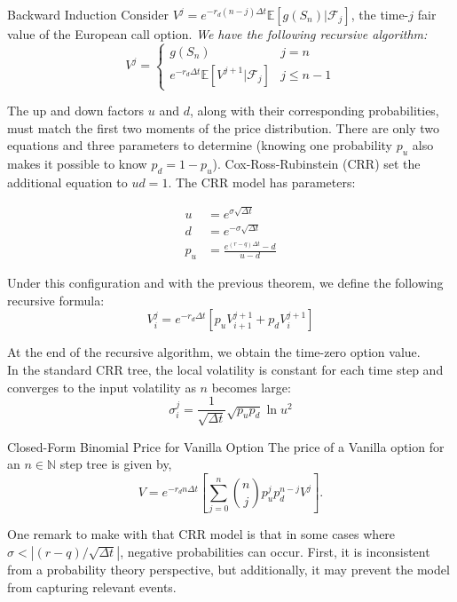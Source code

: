 \begin{thm}{Backward Induction}{}
	Consider \(V^j = e^{-r_d (n-j) \Delta t} \mathbb{E}[g(S_n) | \mathcal{F}_j]\), the time-\(j\) fair value of the European call option. \emph{We have the following recursive algorithm:}
	\[
		V^j =
		\begin{cases}
			g(S_n)                                                & j = n      \\
			e^{-r_d \Delta t} \mathbb{E}[V^{j+1} | \mathcal{F}_j] & j \leq n-1
		\end{cases}
	\]
\end{thm}

The up and down factors \(u\) and \(d\), along with their corresponding probabilities, must match the first two moments of the price distribution. There are only two equations and three parameters to determine (knowing one probability \(p_u\) also makes it possible to know \(p_d = 1-p_u\)). Cox-Ross-Rubinstein (CRR) set the additional equation to \(ud = 1\). The CRR model has parameters:

\begin{align}
	u   & = e^{\sigma \sqrt{\Delta t}}          \\
	d   & = e^{-\sigma \sqrt{\Delta t}}         \\
	p_u & = \frac{e^{(r-q)\Delta t} - d}{u - d}
\end{align}

Under this configuration and with the previous theorem, we define the following recursive formula:
\begin{equation}
	V^j_i = e^{-r_d \Delta t} \left[ p_u V^{j+1}_{i+1} + p_d V^{j+1}_i \right]
\end{equation}

At the end of the recursive algorithm, we obtain the time-zero option value.\\
In the standard CRR tree, the local volatility is constant for each time step and converges to the input volatility as \(n\) becomes large:
\begin{equation}
	\sigma^{j}_i = \frac{1}{\sqrt{\Delta t}} \sqrt{p_u p_d} \ln u^2
\end{equation}

\begin{thm}{Closed-Form Binomial Price for Vanilla Option}{}
	The price of a Vanilla option for an \(n \in \mathbb{N}\) step tree is given by,
	\[
		V = e^{-r_d n \Delta t} \left[ \sum_{j=0}^{n} \binom{n}{j} p_u^j p_d^{n-j} V^j \right].
	\]
\end{thm}
\begin{xattention}
	One remark to make with that CRR model is that in some cases where \(\sigma < |(r-q)/\sqrt{\Delta t}|\), negative probabilities can occur. First, it is inconsistent from a probability theory perspective, but additionally, it may prevent the model from capturing relevant events.
\end{xattention}

